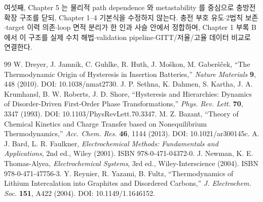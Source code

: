 \documentclass[11pt,a4paper]{article}
\begin{document}
여섯째, Chapter 5 는 물리적 path dependence 와 metastability 를 중심으로 충방전 확장 구조를 닫되, Chapter 1--4
기본식을 수정하지 않는다. 충전 부호 유도$\cdot$2법칙 보존$\cdot$target 이력 의존$\cdot$loop 면적 분리가 한 인과
사슬 안에서 정합하며, Chapter 1 부록 B 에서 이 구조를 실제 수치 해법$\cdot$validation pipeline$\cdot$GITT/저율/고율
데이터 비교로 연결한다.

\begin{thebibliography}{99}
 W. Dreyer, J. Jamnik, C. Guhlke, R. Huth, J. Mo\v{s}kon, M. Gaber\v{s}\v{c}ek, ``The Thermodynamic Origin of Hysteresis in Insertion Batteries,'' \emph{Nature Materials} \textbf{9}, 448 (2010). DOI: 10.1038/nmat2730.
 J. P. Sethna, K. Dahmen, S. Kartha, J. A. Krumhansl, B. W. Roberts, J. D. Shore, ``Hysteresis and Hierarchies: Dynamics of Disorder-Driven First-Order Phase Transformations,'' \emph{Phys. Rev. Lett.} \textbf{70}, 3347 (1993). DOI: 10.1103/PhysRevLett.70.3347.
 M. Z. Bazant, ``Theory of Chemical Kinetics and Charge Transfer based on Nonequilibrium Thermodynamics,'' \emph{Acc. Chem. Res.} \textbf{46}, 1144 (2013). DOI: 10.1021/ar300145c.
 A. J. Bard, L. R. Faulkner, \emph{Electrochemical Methods: Fundamentals and Applications}, 2nd ed., Wiley (2001). ISBN 978-0-471-04372-0.
 J. Newman, K. E. Thomas-Alyea, \emph{Electrochemical Systems}, 3rd ed., Wiley-Interscience (2004). ISBN 978-0-471-47756-3.
 Y. Reynier, R. Yazami, B. Fultz, ``Thermodynamics of Lithium Intercalation into Graphites and Disordered Carbons,'' \emph{J. Electrochem. Soc.} \textbf{151}, A422 (2004). DOI: 10.1149/1.1646152.
\end{thebibliography}
\end{document}
